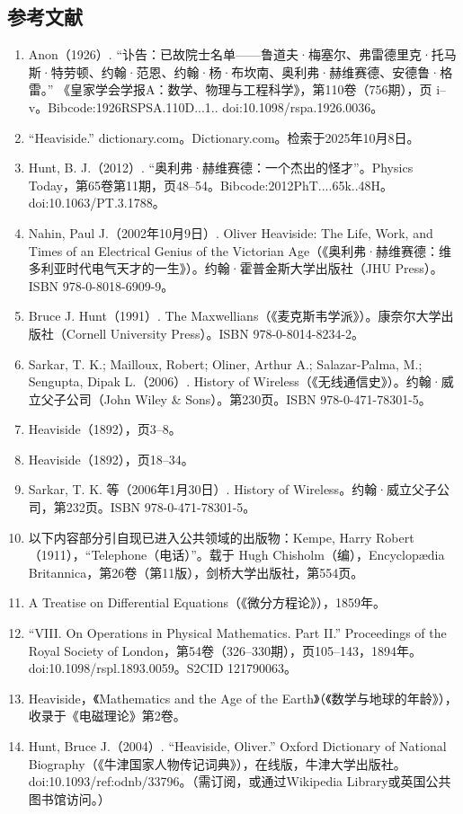 \subsection{参考文献}
\begin{enumerate}
\item Anon（1926）. “讣告：已故院士名单——鲁道夫·梅塞尔、弗雷德里克·托马斯·特劳顿、约翰·范恩、约翰·杨·布坎南、奥利弗·赫维赛德、安德鲁·格雷。” 《皇家学会学报A：数学、物理与工程科学》，第110卷（756期），页 i–v。Bibcode:1926RSPSA.110D...1.. doi:10.1098/rspa.1926.0036。
\item “Heaviside.” dictionary.com。Dictionary.com。检索于2025年10月8日。
\item Hunt, B. J.（2012）. “奥利弗·赫维赛德：一个杰出的怪才”。Physics Today，第65卷第11期，页48–54。Bibcode:2012PhT....65k..48H。doi:10.1063/PT.3.1788。
\item Nahin, Paul J.（2002年10月9日）. Oliver Heaviside: The Life, Work, and Times of an Electrical Genius of the Victorian Age（《奥利弗·赫维赛德：维多利亚时代电气天才的一生》）。约翰·霍普金斯大学出版社（JHU Press）。ISBN 978-0-8018-6909-9。
\item Bruce J. Hunt（1991）. The Maxwellians（《麦克斯韦学派》）。康奈尔大学出版社（Cornell University Press）。ISBN 978-0-8014-8234-2。
\item Sarkar, T. K.; Mailloux, Robert; Oliner, Arthur A.; Salazar-Palma, M.; Sengupta, Dipak L.（2006）. History of Wireless（《无线通信史》）。约翰·威立父子公司（John Wiley & Sons）。第230页。ISBN 978-0-471-78301-5。
\item Heaviside（1892），页3–8。
\item Heaviside（1892），页18–34。
\item Sarkar, T. K. 等（2006年1月30日）. History of Wireless。约翰·威立父子公司，第232页。ISBN 978-0-471-78301-5。
\item 以下内容部分引自现已进入公共领域的出版物：Kempe, Harry Robert（1911），“Telephone（电话）”。载于 Hugh Chisholm（编），Encyclopædia Britannica，第26卷（第11版），剑桥大学出版社，第554页。
\item A Treatise on Differential Equations（《微分方程论》），1859年。
\item “VIII. On Operations in Physical Mathematics. Part II.” Proceedings of the Royal Society of London，第54卷（326–330期），页105–143，1894年。doi:10.1098/rspl.1893.0059。S2CID 121790063。
\item Heaviside，《Mathematics and the Age of the Earth》（《数学与地球的年龄》），收录于《电磁理论》第2卷。
\item Hunt, Bruce J.（2004）. “Heaviside, Oliver.” Oxford Dictionary of National Biography（《牛津国家人物传记词典》），在线版，牛津大学出版社。doi:10.1093/ref:odnb/33796。（需订阅，或通过Wikipedia Library或英国公共图书馆访问。）

\end{enumerate}
